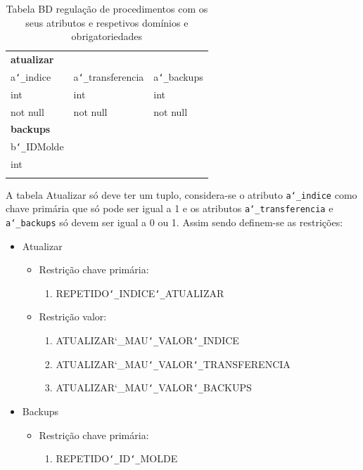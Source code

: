 \documentclass[11pt,twoside,a4paper]{report}
\begin{document}
\begin{table}
	\centering
	\begin{tabular}{|l|l|l|}
		\multicolumn{3}{l}{\textbf{atualizar}}\\ \cline{1-3}
		a\texttt{\char`_}indice & a\texttt{\char`_}transferencia & a\texttt{\char`_}backups\\ \cline{1-3}
		int & int & int\\ \cline{1-3}
		not null & not null & not null\\ \cline{1-3}
		\multicolumn{3}{l}{\textbf{backups}}\\ \cline{1-1}
		b\texttt{\char`_}IDMolde &\multicolumn{2}{l}{}\\ \cline{1-1}
		int &\multicolumn{1}{l}{}\\ \cline{1-1}
		 &\multicolumn{2}{l}{}\\ \cline{1-1}
	\end{tabular}
	\caption[Tabelas da base de dados regulação de procedimentos com os seus atributos e respetivos domínios e obrigatoriedades]{Tabela BD regulação de procedimentos com os seus atributos e respetivos domínios e obrigatoriedades}
	\label{tab:notificacoes}
\end{table}
\newpage
A tabela Atualizar só deve ter um tuplo, considera-se o atributo \texttt{a\char`_indice} como chave primária que só pode ser igual a 1 e os atributos \texttt{a\char`_transferencia} e \texttt{a\char`_backups} só devem ser igual a 0 ou 1. Assim sendo definem-se as restrições:
\begin{itemize}[noitemsep]
	\item Atualizar
	\begin{itemize}[noitemsep]
		\item Restrição chave primária:
		\begin{enumerate}
			\item REPETIDO\texttt{\char`_}INDICE\texttt{\char`_}ATUALIZAR
		\end{enumerate}
		\item Restrição valor:
		\begin{enumerate}
			\item ATUALIZAR{\char`_}MAU\texttt{\char`_}VALOR\texttt{\char`_}INDICE
			\item ATUALIZAR{\char`_}MAU\texttt{\char`_}VALOR\texttt{\char`_}TRANSFERENCIA
			\item ATUALIZAR{\char`_}MAU\texttt{\char`_}VALOR\texttt{\char`_}BACKUPS
		\end{enumerate}
	\end{itemize}
	\item Backups
	\begin{itemize}[noitemsep]
		\item Restrição chave primária:
		\begin{enumerate}
			\item REPETIDO\texttt{\char`_}ID\texttt{\char`_}MOLDE
		\end{enumerate}
	\end{itemize}
\end{itemize}
\end{document}
